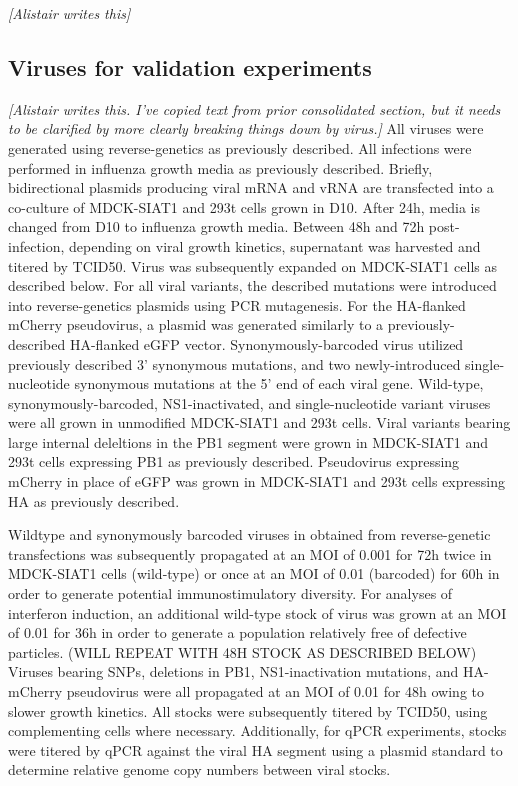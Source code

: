 \documentclass[9pt,lineno]{elife}
\newcommand{\jdbcomment}[1]{\emph{\color{red} [#1]}}
\begin{document}
\jdbcomment{Alistair writes this}

\subsection{Viruses for validation experiments}
\jdbcomment{Alistair writes this. I've copied text from prior consolidated section, but it needs to be clarified by more clearly breaking things down by virus.}
All viruses were generated using reverse-genetics as previously described.
All infections were performed in influenza growth media as previously described.
Briefly, bidirectional plasmids producing viral mRNA and vRNA are transfected into a co-culture of MDCK-SIAT1 and 293t cells grown in D10.
After 24h, media is changed from D10 to influenza growth media.
Between 48h and 72h post-infection, depending on viral growth kinetics, supernatant was harvested and titered by TCID50.
Virus was subsequently expanded on MDCK-SIAT1 cells as described below.
For all viral variants, the described mutations were introduced into reverse-genetics plasmids using PCR mutagenesis. 
For the HA-flanked mCherry pseudovirus, a plasmid was generated similarly to a previously-described HA-flanked eGFP vector.
Synonymously-barcoded virus utilized previously described 3' synonymous mutations, and two newly-introduced single-nucleotide synonymous mutations at the 5' end of each viral gene.
Wild-type, synonymously-barcoded, NS1-inactivated, and single-nucleotide variant viruses were all grown in unmodified MDCK-SIAT1 and 293t cells.
Viral variants bearing large internal deleltions in the PB1 segment were grown in MDCK-SIAT1 and 293t cells expressing PB1 as previously described.
Pseudovirus expressing mCherry in place of eGFP was grown in MDCK-SIAT1 and 293t cells expressing HA as previously described.

Wildtype and synonymously barcoded viruses in  obtained from reverse-genetic transfections was subsequently propagated at an MOI of 0.001 for 72h twice in MDCK-SIAT1 cells (wild-type) or once at an MOI of 0.01 (barcoded) for 60h in order to generate potential immunostimulatory diversity.
For analyses of interferon induction, an additional wild-type stock of virus was grown at an MOI of 0.01 for 36h in order to generate a population relatively free of defective particles. (WILL REPEAT WITH 48H STOCK AS DESCRIBED BELOW)
Viruses bearing SNPs, deletions in PB1, NS1-inactivation mutations, and HA-mCherry pseudovirus were all propagated at an MOI of 0.01 for 48h owing to slower growth kinetics. 
All stocks were subsequently titered by TCID50, using complementing cells where necessary.
Additionally, for qPCR experiments, stocks were titered by qPCR against the viral HA segment using a plasmid standard to determine relative genome copy numbers between viral stocks.
\end{document}
